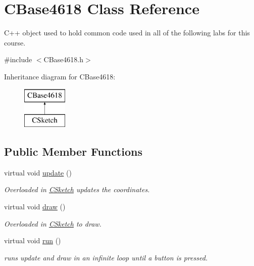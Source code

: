 \hypertarget{class_c_base4618}{}\section{C\+Base4618 Class Reference}
\label{class_c_base4618}


C++ object used to hold common code used in all of the following labs for this course.  




{\ttfamily \#include $<$C\+Base4618.\+h$>$}

Inheritance diagram for C\+Base4618\+:\begin{figure}[H]
\begin{center}
\leavevmode
\includegraphics[height=2.000000cm]{class_c_base4618}
\end{center}
\end{figure}
\subsection*{Public Member Functions}
\begin{DoxyCompactItemize}
\item 
virtual void \hyperlink{class_c_base4618_ae1ac81eaa56ded6600262c361f723cb8}{update} ()
\begin{DoxyCompactList}\small\item\em Overloaded in \hyperlink{class_c_sketch}{C\+Sketch} updates the coordinates. \end{DoxyCompactList}\item 
virtual void \hyperlink{class_c_base4618_a853327d563d064bb31db241861c4d291}{draw} ()
\begin{DoxyCompactList}\small\item\em Overloaded in \hyperlink{class_c_sketch}{C\+Sketch} to draw. \end{DoxyCompactList}\item 
virtual void \hyperlink{class_c_base4618_a535e816d735d10d6048dd39cd893d393}{run} ()
\begin{DoxyCompactList}\small\item\em runs update and draw in an infinite loop until a button is pressed. \end{DoxyCompactList}\end{DoxyCompactItemize}
